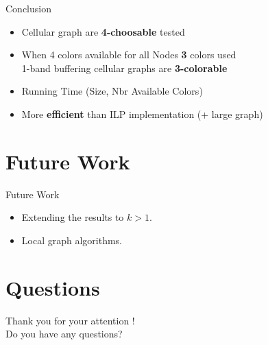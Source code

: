 \documentclass{beamer}
\begin{document}
\begin{frame}{Conclusion}

\begin{block}{}
\begin{itemize}
\item Cellular graph are \textbf{4-choosable} \textrightarrow{} tested
\item When 4 colors available for all Nodes \textrightarrow{} \textbf{3} colors used\\
\textrightarrow{} 1-band buffering cellular graphs are \textbf{3-colorable}
\end{itemize}
 
\end{block}
\vskip 1cm
\begin{block}{}

\begin{itemize}
\item Running Time (Size, Nbr Available Colors)
\item More \textbf{efficient} than ILP implementation (+ large graph)
\end{itemize}

\end{block}

\end{frame}


\section{Future Work}

\begin{frame}{Future Work}

\begin{itemize}
  \item Extending the results to $k > 1$.
  \item Local graph algorithms.
\end{itemize}

\end{frame}

\section{Questions}

\begin{frame}
\Huge{Thank you for your attention !\\
Do you have any questions?}
\end{frame}
\end{document}
